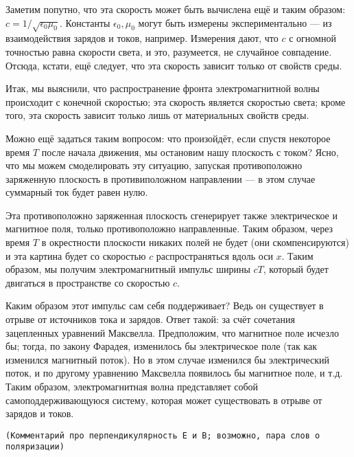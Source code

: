 \documentclass[a4paper,12pt]{article}
\numberwithin{equation}{section}
\newcommand{\eps}{\epsilon}
\newcommand{\com}[1]{{\Large{\texttt{{\color{red}(#1)}}}}}
\begin{document}
Заметим попутно, что эта скорость может быть вычислена ещё и таким
образом: $c= 1/ \sqrt{\eps_0 \mu_0}$. Константы $\eps_0, \mu_{0}$
могут быть измерены экспериментально --- из взаимодействия зарядов и
токов, например. Измерения дают, что $c$ с огномной точностью равна
скорости света, и это, разумеется, не случайное совпадение. Отсюда,
кстати, ещё следует, что эта скорость зависит только от свойств среды.

Итак, мы выяснили, что распространение фронта электромагнитной волны
происходит с конечной скоростью; эта скорость является скоростью
света; кроме того, эта скорость зависит только лишь от материальных
свойств среды.

Можно ещё задаться таким вопросом: что произойдёт, если спустя
некоторое время $T$ после начала движения, мы остановим нашу плоскость
с током? Ясно, что мы можем смоделировать эту ситуацию, запуская
противоположно заряженную плоскость в противиположном направлении ---
в этом случае суммарный ток будет равен нулю. 

Эта противоположно заряженная плоскость сгенерирует также
электрическое и магнитное поля, только противоположно
направленные. Таким образом, через время $T$ в окрестности плоскости
никаких полей не будет (они скомпенсируются) и эта картина будет со
скоростью $c$ распространяться вдоль оси $x$. Таким образом, мы
получим электромагнитный импульс ширины $cT$, который будет двигаться
в пространстве со скоростью $c$. 

Каким образом этот импульс сам себя поддерживает? Ведь он существует в
отрыве от источников тока и зарядов. Ответ такой: за счёт сочетания
зацепленных уравнений Максвелла. Предположим, что магнитное поле
исчезло бы; тогда, по закону Фарадея, изменилось бы электрическое поле
(так как изменился магнитный поток). Но в этом случае изменился бы
электрический поток, и по другому уравнению Максвелла появилось бы
магнитное поле, и т.д. Таким образом, электромагнитная волна
представляет собой самоподдерживающуюся систему, которая может
существовать в отрыве от зарядов и токов.

\com{Комментарий про перпендикулярность E и B; возможно, пара слов о поляризации}
\end{document}
